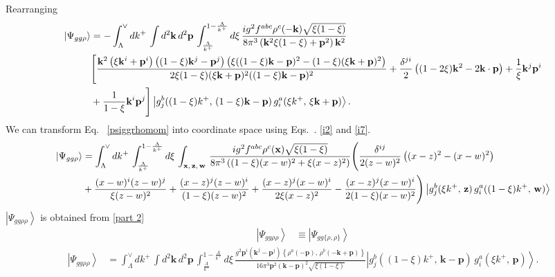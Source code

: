 \documentclass[10pt]{article}
\numberwithin{equation}{section}
\begin{document}
Rearranging
\begin{align}\label{psiggrhomomre}
    \left|\Psi_{gg\rho}\right\rangle  & = -\int_{\Lambda}^{\vee}dk^{+}\,\int d^{2}\mathbf{k}\, d^{2}\mathbf{p}\,\int_{\frac{\Lambda}{k^{+}}}^{1-\frac{\Lambda}{k^{+}}}d\xi\,\frac{ig^{2}f^{abc}\rho^{c}(-\mathbf{k})\sqrt{\xi(1-\xi)}}{8\pi^{3}\left(\mathbf{k}^{2}\xi(1-\xi)+\mathbf{p}^{2}\right)\mathbf{k}^{2}}\notag \\
&\Bigg[\frac{\mathbf{k}^{2}\left(\xi \mathbf{k}^{i}+\mathbf{p}^{i}\right)\left((1-\xi)\mathbf{k}^{j}-\mathbf{p}^{j}\right)\left(\xi((1-\xi)\mathbf{k}-\mathbf{p})^{2}-(1-\xi)(\xi \mathbf{k}+\mathbf{p})^{2}\right)}{2\xi(1-\xi)(\xi \mathbf{k}+\mathbf{p})^{2}((1-\xi)\mathbf{k}-\mathbf{p})^{2}}+\frac{\delta^{ji}}{2}\left((1-2\xi)\mathbf{k}^{2}-2\mathbf{k}\cdot\mathbf{p}\right)+\frac{1}{\xi}\mathbf{k}^{j}\mathbf{p}^{i}\notag \\ & +\frac{1}{1-\xi}\mathbf{k}^{i}\mathbf{p}^{j}\Bigg] \left|g_{j}^{b}((1-\xi)k^{+},\,(1-\xi)\mathbf{k}-\mathbf{p})\, g_{i}^{a}(\xi k^{+},\,\xi\mathbf{k}+\mathbf{p})\right\rangle.
\end{align}
We can transform Eq.~ \eqref{psiggrhomom} into coordinate space using Eqs.~. \eqref{i2} and \eqref{i7}.
\begin{align}\label{ggrhopos}
 \left|\Psi_{gg\rho}\right\rangle  & = \int_{\Lambda}^{\vee}dk^{+}\,\int_{\frac{\Lambda}{k^{+}}}^{1-\frac{\Lambda}{k^{+}}}d\xi\,\int_{\mathbf{x},\, \mathbf{z},\, \mathbf{w}}\,\frac{ig^{2}f^{abc}\rho^{c}(\mathbf{x})\sqrt{\xi(1-\xi)}}{8\pi^{3}\left((1-\xi)(x-w)^{2}+\xi (x-z)^{2}\right)}\Bigg(\frac{\delta^{ij}}{2(z-w)^{2}}\left((x-z)^{2}-(x-w)^{2}\right)\notag \\ & +\frac{(x-w)^{i}(z-w)^{j}}{\xi (z-w)^{2}}+\frac{(x-z)^{j}(z-w)^{i}}{(1-\xi)(z-w)^{2}}+\frac{(x-z)^{j}(x-w)^{i}}{2\xi (x-z)^{2}} -\frac{(x-z)^{j}(x-w)^{i}}{2(1-\xi)(x-w)^{2}}\Bigg)\left|g_{j}^{b}(\xi k^{+},\,\mathbf{z})\, g_{i}^{a}((1-\xi)k^{+},\,\mathbf{w})\right\rangle
\end{align}
$\left|\Psi_{gg\rho\rho}\right\rangle$ is obtained from \eqref{part 2}
\begin{align}
    \left|\Psi_{gg\rho\rho}\right\rangle & \equiv \left|\Psi_{gg\{\rho,\rho\}}\right\rangle
\end{align}
\begin{align}\label{ggrhorhomom}
\left|\Psi_{gg\rho\rho}\right\rangle & = \int_{\Lambda}^{\vee}dk^{+}\,\int d^{2}\mathbf{k}\, d^{2}\mathbf{p}\,\int_{\frac{\Lambda}{k^{+}}}^{1-\frac{\Lambda}{k^{+}}}d\xi\,\frac{g^{2}\mathbf{p}^{i}\left(\mathbf{k}^{j}-\mathbf{p}^{j}\right)\left\{ \rho^{a}(-\mathbf{p}),\,\rho^{b}(-\mathbf{k}+\mathbf{p})\right\} }{16\pi^{3}\mathbf{p}^{2}(\mathbf{k}-\mathbf{p})^{2}\sqrt{\xi(1-\xi)}}  \left|g_{j}^{b}((1-\xi)k^{+},\,\mathbf{k}-\mathbf{p})\,g_{i}^{a}(\xi k^{+},\,\mathbf{p})\right\rangle.
\end{align}
\end{document}
